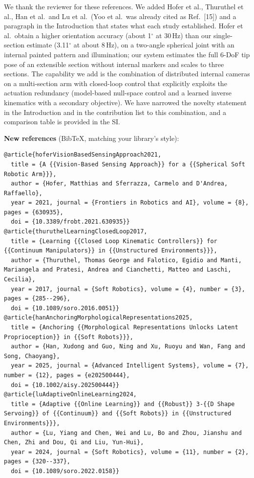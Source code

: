 \documentclass[10pt,a4paper]{article}
\begin{document}
\begin{resp}
We thank the reviewer for these references. We added Hofer et al., Thuruthel et al., Han et al.\ and Lu et al.\ (Yoo et al.\ was already cited as Ref.~[15]) and a paragraph in the Introduction that states what each study established. Hofer et al.\ obtain a higher orientation accuracy (about 1$^\circ$ at 30\,Hz) than our single-section estimate (3.11$^\circ$ at about 8\,Hz), on a two-angle spherical joint with an internal painted pattern and illumination; our system estimates the full 6-DoF tip pose of an extensible section without internal markers and scales to three sections. The capability we add is the combination of distributed internal cameras on a multi-section arm with closed-loop control that explicitly exploits the actuation redundancy (model-based null-space control and a learned inverse kinematics with a secondary objective). We have narrowed the novelty statement in the Introduction and in the contribution list to this combination, and a comparison table is provided in the SI.
\end{resp}

\textbf{New references} (BibTeX, matching your library's style):
{\scriptsize
\begin{verbatim}
@article{hoferVisionBasedSensingApproach2021,
  title = {A {{Vision-Based Sensing Approach}} for a {{Spherical Soft Robotic Arm}}},
  author = {Hofer, Matthias and Sferrazza, Carmelo and D'Andrea, Raffaello},
  year = 2021, journal = {Frontiers in Robotics and AI}, volume = {8}, pages = {630935},
  doi = {10.3389/frobt.2021.630935}}
@article{thuruthelLearningClosedLoop2017,
  title = {Learning {{Closed Loop Kinematic Controllers}} for {{Continuum Manipulators}} in {{Unstructured Environments}}},
  author = {Thuruthel, Thomas George and Falotico, Egidio and Manti, Mariangela and Pratesi, Andrea and Cianchetti, Matteo and Laschi, Cecilia},
  year = 2017, journal = {Soft Robotics}, volume = {4}, number = {3}, pages = {285--296},
  doi = {10.1089/soro.2016.0051}}
@article{hanAnchoringMorphologicalRepresentations2025,
  title = {Anchoring {{Morphological Representations Unlocks Latent Proprioception}} in {{Soft Robots}}},
  author = {Han, Xudong and Guo, Ning and Xu, Ruoyu and Wan, Fang and Song, Chaoyang},
  year = 2025, journal = {Advanced Intelligent Systems}, volume = {7}, number = {12}, pages = {e202500444},
  doi = {10.1002/aisy.202500444}}
@article{luAdaptiveOnlineLearning2024,
  title = {Adaptive {{Online Learning}} and {{Robust}} 3-{{D Shape Servoing}} of {{Continuum}} and {{Soft Robots}} in {{Unstructured Environments}}},
  author = {Lu, Yiang and Chen, Wei and Lu, Bo and Zhou, Jianshu and Chen, Zhi and Dou, Qi and Liu, Yun-Hui},
  year = 2024, journal = {Soft Robotics}, volume = {11}, number = {2}, pages = {320--337},
  doi = {10.1089/soro.2022.0158}}
\end{verbatim}}
\end{document}
